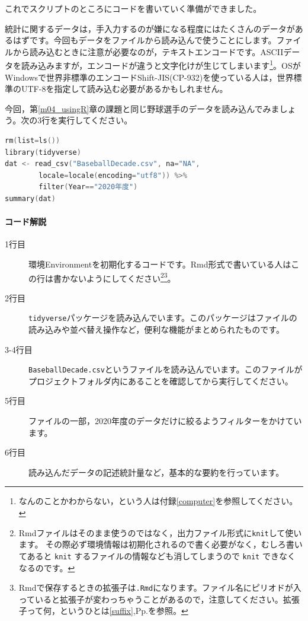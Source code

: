 \documentclass{ltjbook}
\begin{document}
これでスクリプトのところにコードを書いていく準備ができました。

統計に関するデータは，手入力するのが嫌になる程度にはたくさんのデータがあるはずです。今回もデータをファイルから読み込んで使うことにします。ファイルから読み込むときに注意が必要なのが，テキストエンコードです。ASCIIデータを読み込みますが，エンコードが違うと文字化けが生じてしまいます\footnote{なんのことかわからない，という人は付録\ref{computer}を参照してください。}。OSがWindowsで世界非標準のエンコードShift-JIS(CP-932)を使っている人は，世界標準のUTF-8を指定して読み込む必要があるかもしれません。

今回，第\ref{m04_usingR}章の課題と同じ野球選手のデータを読み込んでみましょう。次の3行を実行してください。

\begin{lstlisting}[language=c++,label={code:11_01},caption={環境の初期化とパッケージ，ファイルの読み込み}]
rm(list=ls())
library(tidyverse)
dat <- read_csv("BaseballDecade.csv", na="NA", 
        locale=locale(encoding="utf8")) %>% 
        filter(Year=="2020年度")
summary(dat)
\end{lstlisting}

\paragraph{コード解説}
\begin{description}
	\item[1行目] 環境Environmentを初期化するコードです。Rmd形式で書いている人はこの行は書かないようにしてください\footnote{Rmdファイルはそのまま使うのではなく，出力ファイル形式に\verb|knit|して使います。 その際必ず環境情報は初期化されるので書く必要がなく，むしろ書いてあると \verb|knit| するファイルの情報なども消してしまうので \verb|knit| できなくなるのです。}\footnote{Rmdで保存するときの拡張子は\verb|.Rmd|になります。ファイル名にピリオドが入っていると拡張子が変わっちゃうことがあるので，注意してください。拡張子って何，というひとは\ref{suffix},Pp.\pageref{suffix}を参照。}。
	\item[2行目] \texttt{tidyverse}パッケージを読み込んでいます。このパッケージはファイルの読み込みや並べ替え操作など，便利な機能がまとめられたものです。
	\item[3-4行目] \texttt{BaseballDecade.csv}というファイルを読み込んでいます。このファイルがプロジェクトフォルダ内にあることを確認してから実行してください。
	\item[5行目] ファイルの一部，2020年度のデータだけに絞るようフィルターをかけています。
	\item[6行目] 読み込んだデータの記述統計量など，基本的な要約を行っています。
\end{description}
\end{document}
